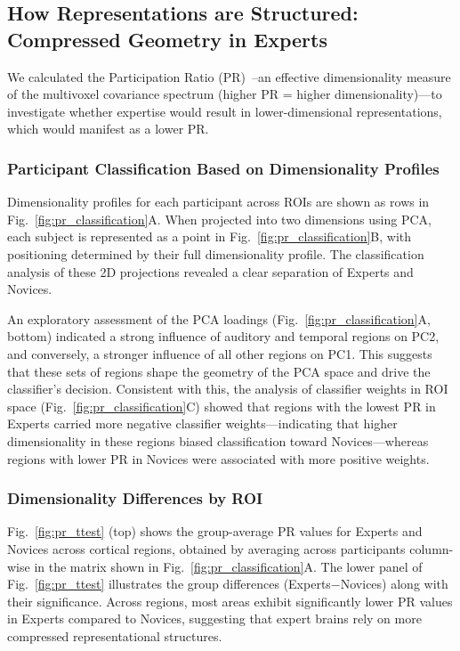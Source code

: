 \documentclass[preprint,12pt]{elsarticle}
\begin{document}
\subsection{How Representations are Structured: Compressed Geometry in Experts}\label{sec:pr}

We calculated the Participation Ratio (PR)~\cite{gao2017theory, altan2021estimating}--an effective dimensionality measure of the multivoxel covariance spectrum (higher PR = higher dimensionality)—to investigate whether expertise would result in lower-dimensional representations, which would manifest as a lower PR.

\subsubsection{Participant Classification Based on Dimensionality Profiles}  
Dimensionality profiles for each participant across ROIs are shown as rows in Fig.~\ref{fig:pr_classification}A. When projected into two dimensions using PCA, each subject is represented as a point in Fig.~\ref{fig:pr_classification}B, with positioning determined by their full dimensionality profile. The classification analysis of these 2D projections revealed a clear separation of Experts and Novices.  

An exploratory assessment of the PCA loadings (Fig.~\ref{fig:pr_classification}A, bottom) indicated a strong influence of auditory and temporal regions on PC2, and conversely, a stronger influence of all other regions on PC1. This suggests that these sets of regions shape the geometry of the PCA space and drive the classifier’s decision. Consistent with this, the analysis of classifier weights in ROI space (Fig.~\ref{fig:pr_classification}C) showed that regions with the lowest PR in Experts carried more negative classifier weights—indicating that higher dimensionality in these regions biased classification toward Novices—whereas regions with lower PR in Novices were associated with more positive weights.

\subsubsection{Dimensionality Differences by ROI}
Fig.~\ref{fig:pr_ttest} (top) shows the group-average PR values for Experts and Novices across cortical regions, obtained by averaging across participants column-wise in the matrix shown in Fig.~\ref{fig:pr_classification}A. The lower panel of Fig.~\ref{fig:pr_ttest} illustrates the group differences (Experts$-$Novices) along with their significance. Across regions, most areas exhibit significantly lower PR values in Experts compared to Novices, suggesting that expert brains rely on more compressed representational structures.  
\end{document}
